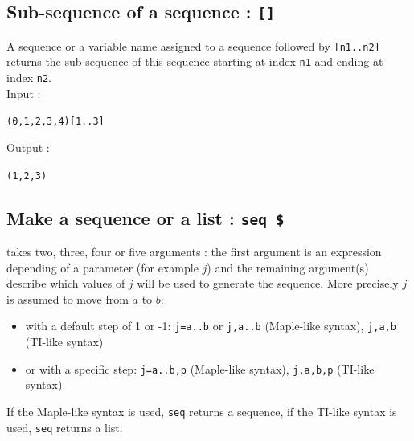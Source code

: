 \documentclass[a4paper,11pt]{book}
\begin{document}
\subsection{Sub-sequence of a sequence : {\tt []}}\index{[]}
A sequence or a variable name assigned to a sequence followed by
{\tt [n1..n2]} returns the sub-sequence of this sequence
starting at index {\tt n1} and ending at index {\tt n2}.\\
Input :
\begin{center}{\tt (0,1,2,3,4)[1..3]}\end{center}
Output :
\begin{center}{\tt (1,2,3)}\end{center}

\subsection{Make a sequence or a list : {\tt seq \$}}\label{sec:seq}
 takes two, three, four or five arguments : the first 
argument is an expression depending of a parameter (for example $j$) and  
the remaining argument(s) describe which values of $j$ will be used to
generate the sequence. More precisely $j$ is assumed to move 
from $a$ to $b$:
\begin{itemize}
\item with a default step of 1 or -1: {\tt j=a..b} or 
{\tt j,a..b} (Maple-like syntax), {\tt j,a,b} (TI-like syntax)
\item or with a specific step: 
{\tt j=a..b,p} (Maple-like syntax), {\tt j,a,b,p} (TI-like syntax).
\end{itemize}
If the Maple-like syntax is used, {\tt seq} returns a sequence,
if the TI-like syntax is used, {\tt seq} returns a list.
 
\end{document}
